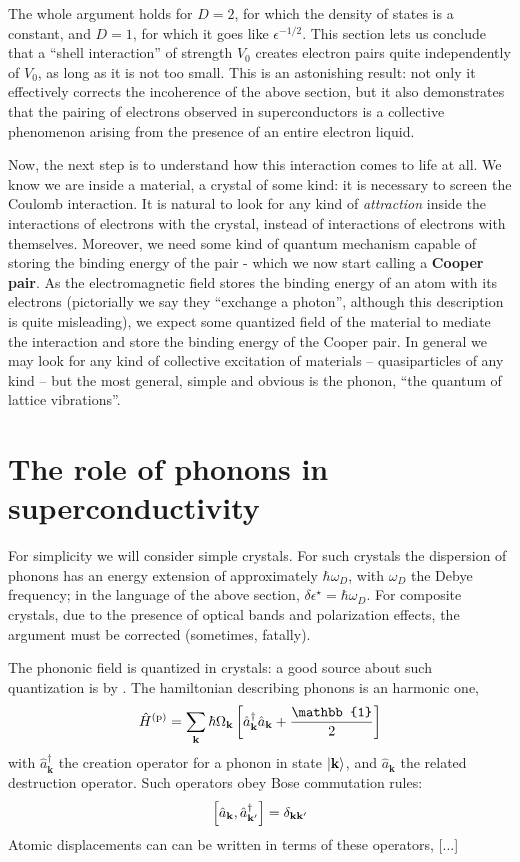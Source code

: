 The whole argument holds for $D=2$, for which the density of states is a constant, and $D=1$, for which it goes like $\epsilon^{-1/2}$. This section lets us conclude that a ``shell interaction'' of strength $V_0$ creates electron pairs quite independently of $V_0$, as long as it is not too small. This is an astonishing result: not only it effectively corrects the incoherence of the above section, but it also demonstrates that the pairing of electrons observed in superconductors is a collective phenomenon arising from the presence of an entire electron liquid.

Now, the next step is to understand how this interaction comes to life at all. We know we are inside a material, a crystal of some kind: it is necessary to screen the Coulomb interaction. It is natural to look for any kind of \textit{attraction} inside the interactions of electrons with the crystal, instead of interactions of electrons with themselves. Moreover, we need some kind of quantum mechanism capable of storing the binding energy of the pair - which we now start calling a \textbf{Cooper pair}. As the electromagnetic field stores the binding energy of an atom with its electrons (pictorially we say they ``exchange a photon'', although this description is quite misleading), we expect some quantized field of the material to mediate the interaction and store the binding energy of the Cooper pair. In general we may look for any kind of collective excitation of materials -- quasiparticles of any kind -- but the most general, simple and obvious is the phonon, ``the quantum of lattice vibrations''.

\section{The role of phonons in superconductivity}

For simplicity we will consider simple crystals. For such crystals the dispersion of phonons has an energy extension of approximately $\hbar\omega_D$, with $\omega_D$ the Debye frequency; in the language of the above section, $\delta\epsilon^\star = \hbar\omega_D$. For composite crystals, due to the presence of optical bands and polarization effects, the argument must be corrected (sometimes, fatally).

The phononic field is quantized in crystals: a good source about such quantization is  \cite{grosso2000solid} by \citeauthor{grosso2000solid}. The hamiltonian describing phonons is an harmonic one,
\[
	\hat H^{(\mathrm{p})} = \sum_\mathbf{k} \hbar \Omega_\mathbf{k} \lrS{\hat a_\mathbf{k}^\dagger \hat a_\mathbf{k} + \frac{\mathbb{1}}{2}}
\]
with $\hat a_\mathbf{k}^\dagger$ the creation operator for a phonon in state $\ket{\mathbf{k}}$, and $\hat a_\mathbf{k}$ the related destruction operator. Such operators obey Bose commutation rules:
\[
	\comm{\hat a_\mathbf{k}}{\hat a_{\mathbf{k}'}^\dagger} = \delta_{\mathbf{k}\mathbf{k}'}
\]
Atomic displacements can can be written in terms of these operators, [...]